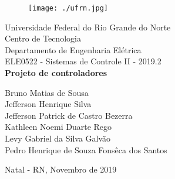 \onehalfspacing
\begin{titlepage}
	\begin{center}
	
	\begin{figure}[!ht]
	\centering
	\texttt{[image: ./ufrn.jpg]}
	\end{figure}
		Universidade Federal do Rio Grande do Norte \\ Centro de Tecnologia \\ Departamento de Engenharia Elétrica \\ ELE0522 - Sistemas de Controle II - 2019.2 \\
		\vspace{15pt}
        \vspace{95pt}
        \textbf{\Large{Projeto de controladores}}\\
		\vspace{3,5cm}
	\end{center}
	
	\begin{flushright}
			\item Bruno Matias de Sousa \\ Jefferson Henrique Silva \\ Jefferson Patrick de Castro Bezerra \\ Kathleen Noemi Duarte Rego \\ Levy Gabriel da Silva Galvão \\ Pedro Henrique de Souza Fonsêca dos Santos \\
 	\end{flushright}
	\vspace{1cm}
	
	\begin{center}
		\vspace{\fill}
		Natal - RN, Novembro de 2019
	\end{center}
\end{titlepage}





